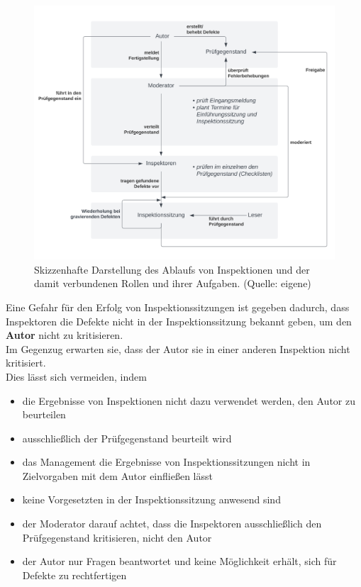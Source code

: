 \begin{figure}
    \centering
    \includegraphics[scale=0.4]{part four/Manuelle Verfahren/img/inspektion}
    \caption{Skizzenhafte Darstellung des Ablaufs von Inspektionen und der damit verbundenen Rollen und ihrer Aufgaben. (Quelle: eigene)}
    \label{fig:inspektion}
\end{figure}


\noindent
Eine Gefahr für den Erfolg von Inspektionssitzungen ist gegeben dadurch, dass Inspektoren die Defekte nicht in der Inspektionssitzung bekannt geben, um den \textbf{Autor} nicht zu kritisieren.\\
Im Gegenzug erwarten sie, dass der Autor sie in einer anderen Inspektion nicht kritisiert.\\
Dies lässt sich vermeiden, indem

\begin{itemize}
    \item die Ergebnisse von Inspektionen nicht dazu verwendet werden, den Autor zu beurteilen
    \item ausschließlich der Prüfgegenstand beurteilt wird
    \item das Management die Ergebnisse von Inspektionssitzungen nicht in Zielvorgaben mit dem Autor einfließen lässt
    \item keine Vorgesetzten in der Inspektionssitzung anwesend sind
    \item der Moderator darauf achtet, dass die Inspektoren ausschließlich den Prüfgegenstand kritisieren, nicht den Autor
    \item der Autor nur Fragen beantwortet und keine Möglichkeit erhält, sich für Defekte zu rechtfertigen
\end{itemize}

